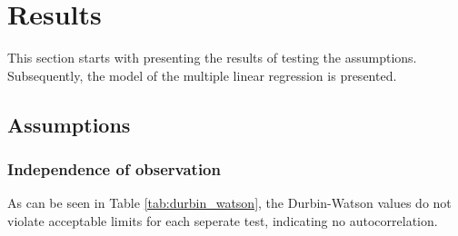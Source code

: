 \documentclass{sigchi}
\begin{document}






\section{Results} %
\label{sec:results}{}
This section starts with presenting the results of testing the assumptions. Subsequently, the model of the multiple linear regression is presented.

\subsection{Assumptions}
\label{sub:assumptions}

\subsubsection{Independence of observation}
As can be seen in Table \ref{tab:durbin_watson}, the Durbin-Watson values do not violate acceptable limits for each seperate test, indicating no autocorrelation.

\end{document}
